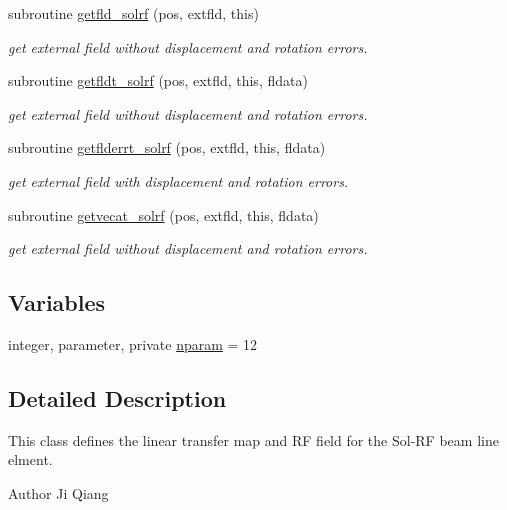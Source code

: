 \begin{DoxyCompactItemize}
subroutine \mbox{\hyperlink{namespacesolrfclass_a394f9bb9d3b50c8652a704f3c5af16ef}{getfld\+\_\+solrf}} (pos, extfld, this)
\begin{DoxyCompactList}\small\item\em get external field without displacement and rotation errors. \end{DoxyCompactList}\item 
subroutine \mbox{\hyperlink{namespacesolrfclass_ac164c5b7477e8ec4278009bd85cd4338}{getfldt\+\_\+solrf}} (pos, extfld, this, fldata)
\begin{DoxyCompactList}\small\item\em get external field without displacement and rotation errors. \end{DoxyCompactList}\item 
subroutine \mbox{\hyperlink{namespacesolrfclass_a81aef201f157970a5566536d7738c3f9}{getflderrt\+\_\+solrf}} (pos, extfld, this, fldata)
\begin{DoxyCompactList}\small\item\em get external field with displacement and rotation errors. \end{DoxyCompactList}\item 
subroutine \mbox{\hyperlink{namespacesolrfclass_a617250299f3409a89fdb6651f353bc8d}{getvecat\+\_\+solrf}} (pos, extfld, this, fldata)
\begin{DoxyCompactList}\small\item\em get external field without displacement and rotation errors. \end{DoxyCompactList}\end{DoxyCompactItemize}
\subsection*{Variables}
\begin{DoxyCompactItemize}
\item 
integer, parameter, private \mbox{\hyperlink{namespacesolrfclass_a01b965e25069cff9fb1797fbbcb9939d}{nparam}} = 12
\end{DoxyCompactItemize}


\subsection{Detailed Description}
This class defines the linear transfer map and RF field for the Sol-\/\+RF beam line elment. 

\begin{DoxyAuthor}{Author}
Ji Qiang 
\end{DoxyAuthor}



